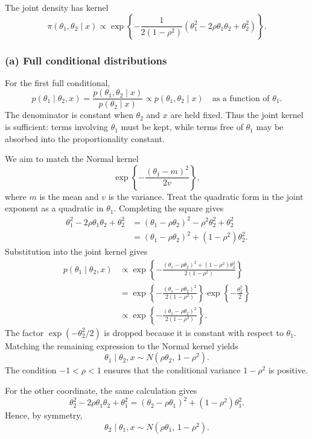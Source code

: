 \documentclass[11pt,a4paper]{article}
\begin{document}
The joint density has kernel
\[
\pi(\theta_1,\theta_2\mid x)
\propto
\exp\left\{
-\frac{1}{2(1-\rho^2)}
\left(\theta_1^2-2\rho\theta_1\theta_2+\theta_2^2\right)
\right\}.
\]

\subsubsection*{(a) Full conditional distributions}

For the first full conditional,
\[
p(\theta_1\mid\theta_2,x)
=
\frac{p(\theta_1,\theta_2\mid x)}{p(\theta_2\mid x)}
\propto p(\theta_1,\theta_2\mid x)
\quad\text{as a function of }\theta_1.
\]
The denominator is constant when \(\theta_2\) and \(x\) are held fixed. Thus
the joint kernel is sufficient: terms involving \(\theta_1\) must be kept,
while terms free of \(\theta_1\) may be absorbed into the proportionality
constant.

We aim to match the Normal kernel
\[
\exp\left\{-\frac{(\theta_1-m)^2}{2v}\right\},
\]
where \(m\) is the mean and \(v\) is the variance. Treat the quadratic form
in the joint exponent as a quadratic in \(\theta_1\). Completing the square
gives
\begin{align*}
\theta_1^2-2\rho\theta_1\theta_2+\theta_2^2
&=(\theta_1-\rho\theta_2)^2
  -\rho^2\theta_2^2+\theta_2^2\\
&=(\theta_1-\rho\theta_2)^2
  +(1-\rho^2)\theta_2^2.
\end{align*}
Substitution into the joint kernel gives
\begin{align*}
p(\theta_1\mid\theta_2,x)
&\propto
\exp\left\{
-\frac{(\theta_1-\rho\theta_2)^2+(1-\rho^2)\theta_2^2}
{2(1-\rho^2)}
\right\}\\
&=
\exp\left\{-\frac{(\theta_1-\rho\theta_2)^2}
{2(1-\rho^2)}\right\}
\exp\left\{-\frac{\theta_2^2}{2}\right\}\\
&\propto
\exp\left\{-\frac{(\theta_1-\rho\theta_2)^2}
{2(1-\rho^2)}\right\}.
\end{align*}
The factor \(\exp(-\theta_2^2/2)\) is dropped because it is constant with
respect to \(\theta_1\). Matching the remaining expression to the Normal
kernel yields
\[
\boxed{
\theta_1\mid\theta_2,x
\sim N\left(\rho\theta_2,\,1-\rho^2\right).
}
\]
The condition \(-1<\rho<1\) ensures that the conditional variance
\(1-\rho^2\) is positive.

For the other coordinate, the same calculation gives
\[
\theta_2^2-2\rho\theta_1\theta_2+\theta_1^2
=
(\theta_2-\rho\theta_1)^2+(1-\rho^2)\theta_1^2.
\]
Hence, by symmetry,
\[
\boxed{
\theta_2\mid\theta_1,x
\sim N\left(\rho\theta_1,\,1-\rho^2\right).
}
\]
\end{document}
